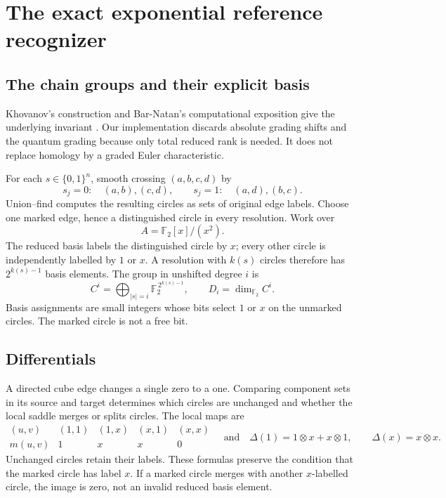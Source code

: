 \documentclass[11pt]{article}
\theoremstyle{remark}\newtheorem{remark}[theorem]{Remark}
\newcommand{\F}{\mathbb F_2}
\begin{document}
\section{The exact exponential reference recognizer}

\subsection{The chain groups and their explicit basis}
Khovanov's construction and Bar-Natan's computational exposition give the
underlying invariant \cite{khovanov,barnatan}. Our implementation discards
absolute grading shifts and the quantum grading because only total reduced
rank is needed. It does not replace homology by a graded Euler characteristic.

For each $s\in\{0,1\}^n$, smooth crossing $(a,b,c,d)$ by
\[
 s_j=0:\quad (a,b),(c,d),\qquad
 s_j=1:\quad (a,d),(b,c).
\]
Union--find computes the resulting circles as sets of original edge labels.
Choose one marked edge, hence a distinguished circle in every resolution.
Work over
\[
 A=\F[x]/(x^2).
\]
The reduced basis labels the distinguished circle by $x$; every other circle
is independently labelled by $1$ or $x$. A resolution with $k(s)$ circles
therefore has $2^{k(s)-1}$ basis elements. The group in unshifted degree $i$ is
\[
 C^i=\bigoplus_{|s|=i} \F^{\,2^{k(s)-1}},\qquad
 D_i=\dim_{\F}C^i.
\]
Basis assignments are small integers whose bits select $1$ or $x$ on the
unmarked circles. The marked circle is not a free bit.

\subsection{Differentials}
A directed cube edge changes a single zero to a one. Comparing component sets
in its source and target determines which circles are unchanged and whether
the local saddle merges or splits circles. The local maps are
\[
\begin{array}{c|cccc}
(u,v)&(1,1)&(1,x)&(x,1)&(x,x)\\\hline
m(u,v)&1&x&x&0
\end{array}
\quad\text{and}\quad
\Delta(1)=1\otimes x+x\otimes1,\qquad
\Delta(x)=x\otimes x.
\]
Unchanged circles retain their labels. These formulas preserve the condition
that the marked circle has label $x$. If a marked circle merges with another
$x$-labelled circle, the image is zero, not an invalid reduced basis element.
\end{document}
